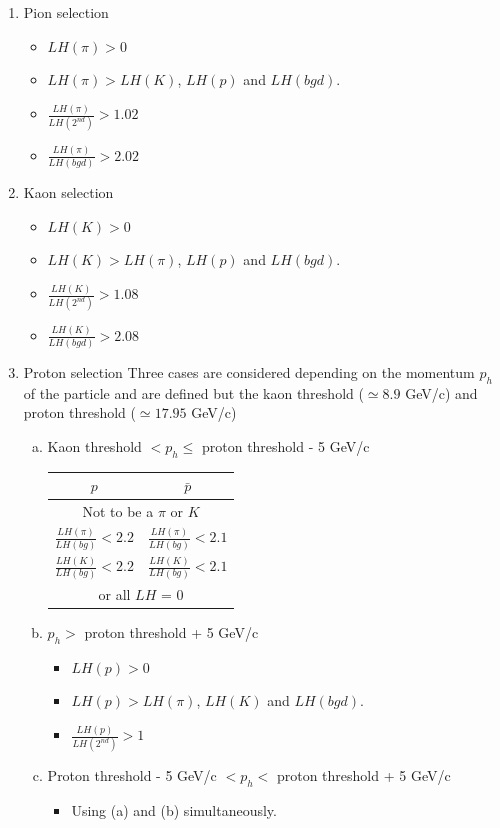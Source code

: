 \documentclass[letterpaper,12pt]{article}
\begin{document}
\begin{enumerate}
  \item Pion selection
  \begin{itemize}
    \item $LH(\pi) > 0$
    \item $LH(\pi) > LH(K)$, $LH(p)$ and $LH(bgd)$.
    \item $\frac{LH(\pi)}{LH(2^{nd})}>1.02$
    \item $\frac{LH(\pi)}{LH(bgd)}>2.02$
  \end{itemize}
  \item Kaon selection
  \begin{itemize}
    \item $LH(K) > 0$
    \item $LH(K) > LH(\pi)$, $LH(p)$ and $LH(bgd)$.
    \item $\frac{LH(K)}{LH(2^{nd})}>1.08$
    \item $\frac{LH(K)}{LH(bgd)}>2.08$
  \end{itemize}
  \item Proton selection
  Three cases are considered depending on the momentum $p_{h}$ of the particle and are defined but the kaon threshold ($\simeq 8.9$ GeV/c)
  and proton threshold ($\simeq 17.95$ GeV/c)
  \begin{enumerate}[(a)]
    \item Kaon threshold $< p_{h} \leq$ proton threshold - 5 GeV/c
	  \begin{center}
		  \begin{tabular}{c|c}
		    \hline
		     $p$ & $\bar{p}$ \\
		    \hline
				\multicolumn{2}{c}{Not to be a $\pi$ or $K$} \\
		    $\frac{LH(\pi)}{LH(bg)} < 2.2$ & $\frac{LH(\pi)}{LH(bg)} < 2.1$ \\
		    $\frac{LH(K)}{LH(bg)} < 2.2$ & $\frac{LH(K)}{LH(bg)} < 2.1$ \\
		    \hline
				\multicolumn{2}{c}{or all $LH$ = 0} \\
				\hline
		  \end{tabular}
		\end{center}
    \item $p_{h} >$ proton threshold + 5 GeV/c
    \begin{itemize}
      \item $LH(p) > 0$
      \item $LH(p) > LH(\pi)$, $LH(K)$ and $LH(bgd)$.
      \item $\frac{LH(p)}{LH(2^{nd})}>1$
    \end{itemize}
    \item Proton threshold - 5 GeV/c $< p_{h} <$ proton threshold + 5 GeV/c
    \begin{itemize}
      \item Using (a) and (b) simultaneously.
    \end{itemize}
  \end{enumerate}
\end{enumerate}
\end{document}
